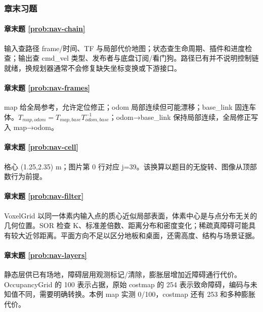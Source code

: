 \subsubsection*{章末习题}

\paragraph*{章末题 \ref{prob:nav-chain}}
\begin{solution}
输入查路径 frame/时间、TF 与局部代价地图；状态查生命周期、插件和进度检查；输出查 cmd\_vel 类型、发布者与底盘订阅/看门狗。路径已有并不说明控制链就绪，换规划器通常不会修复缺失坐标变换或下游接口。
\end{solution}

\paragraph*{章末题 \ref{prob:nav-frames}}
\begin{solution}
map 给全局参考，允许定位修正；odom 局部连续但可能漂移；base\_link 固连车体。$T_{map,odom}=T_{map,base}T_{odom,base}^{-1}$；odom→base\_link 保持局部连续，全局修正写入 map→odom。
\end{solution}

\paragraph*{章末题 \ref{prob:nav-cell}}
\begin{solution}
格心 (1.25,2.35) m；图片第 0 行对应 j=39。该换算以题目的无旋转、图像从顶部数行为前提。
\end{solution}

\paragraph*{章末题 \ref{prob:nav-filter}}
\begin{solution}
VoxelGrid 以同一体素内输入点的质心近似局部表面，体素中心是与点分布无关的几何位置。SOR 检查 K、标准差倍数、距离分布和密度变化；稀疏真障碍可能具有较大近邻距离。平面方向不足以区分地板和桌面，还需高度、结构与场景证据。
\end{solution}

\paragraph*{章末题 \ref{prob:nav-layers}}
\begin{solution}
静态层供已有场地，障碍层用观测标记/清除，膨胀层增加近障碍通行代价。OccupancyGrid 的 100 表示占据，原始 costmap 的 254 表示致命障碍，编码与未知值不同，需要明确转换。本例 map 实测 0/100，costmap 还有 253 和多种膨胀代价。
\end{solution}

